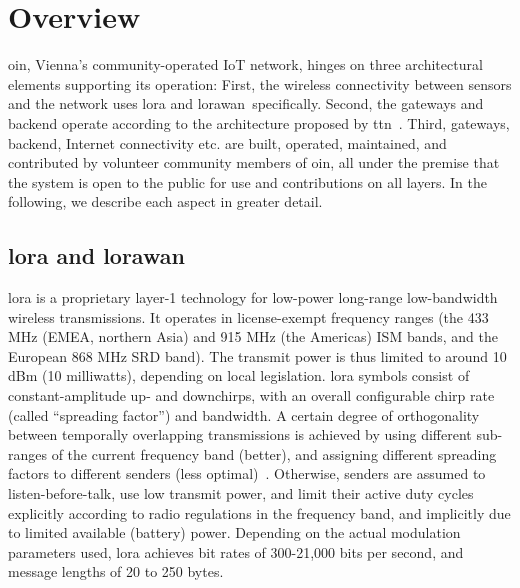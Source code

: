 \section{Overview}\label{sec-overview}

\gls{oin}, Vienna's community-operated \gls{IoT} network, hinges on
three architectural elements supporting its operation:
First, the wireless connectivity between sensors and the network
uses \gls{lora} and \gls{lorawan} specifically.
Second, the gateways and backend operate according to the architecture
proposed by \gls{ttn}~\cite{ttn}.
Third, gateways, backend, Internet connectivity etc. are built, operated,
maintained, and contributed by volunteer community members of \gls{oin},
all under the premise that the system is open to the public for use and
contributions on all layers.
In the following, we describe each aspect in greater detail.


\subsection{\gls{lora} and \gls{lorawan}}

\gls{lora} is a proprietary layer-1 technology for low-power long-range
low-bandwidth wireless transmissions. It operates in license-exempt
frequency ranges (the 433 MHz (EMEA, northern Asia) and 915 MHz
(the Americas) \acrshort{ISM} bands, and the European 868 MHz
\acrshort{SRD} band). The transmit power is thus limited to around
10 dBm (10 milliwatts), depending on local legislation.
\gls{lora} symbols consist of constant-amplitude up- and downchirps,
with an overall configurable chirp rate (called ``spreading factor'')
and bandwidth.
A certain degree of orthogonality between temporally overlapping
transmissions is achieved by using different sub-ranges of
the current frequency band (better), and assigning different spreading
factors to different senders (less optimal)~\cite{croce}.
Otherwise, senders are assumed to listen-before-talk, use low
transmit power, and limit their active duty cycles explicitly
according to radio regulations in the frequency band, and implicitly
due to limited available (battery) power.
Depending on the actual modulation parameters used, \gls{lora}
achieves bit rates of 300-21,000 bits per second, and message lengths
of 20 to 250 bytes.
%

